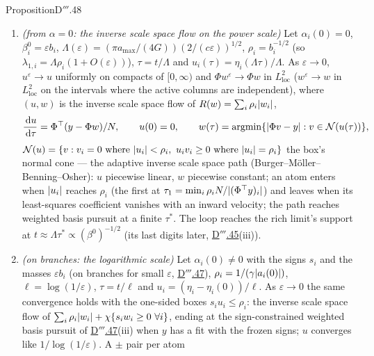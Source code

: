 \begin{thm}{Proposition}{D$'''$.48}
\begin{enumerate}[label=\textup{(\roman*)}]
    is a continuum --- $\alpha(0)\propto\varepsilon^p$ with $0 < p < \frac12$ and $\beta^0\propto\varepsilon$ give
    $\varepsilon^{-p}\log(1/\varepsilon)$, and a branch start with $\alpha(0)\lesssim\varepsilon^{1/2}$ is still on the
    power scale.
  \item \emph{(from $\alpha = 0$: the inverse scale space flow on the power scale)} Let $\alpha_i(0) = 0$,
    $\beta^0_i = \varepsilon b_i$, $\Lambda(\varepsilon) = (\pi a_{\max}/(4G))(2/(c\varepsilon))^{1/2}$,
    $\rho_i = b_i^{-1/2}$ (so $\lambda_{1,i} = \Lambda\rho_i(1 + O(\varepsilon))$), $\tau = t/\Lambda$ and
    $u_i(\tau) = \eta_i(\Lambda\tau)/\Lambda$. As $\varepsilon\to0$, $u^\varepsilon\to u$ uniformly on compacts of
    $[0,\infty)$ and $\Phi w^\varepsilon\to\Phi w$ in $L^2_{\mathrm{loc}}$ ($w^\varepsilon\to w$ in
    $L^2_{\mathrm{loc}}$ on the intervals where the active columns are independent), where $(u,w)$ is the inverse scale
    space flow of $R(w) = \sum_i\rho_i\lvert w_i\rvert$,
    \[
      \frac{\,\mathrm{d} u}{\,\mathrm{d}\tau} = \Phi^\top(y - \Phi w)/N,\qquad u(0) = 0,\qquad
      w(\tau) = \operatorname{argmin}\{\lvert \Phi v - y\rvert : v\in\mathcal N(u(\tau))\},
    \]
    $\mathcal N(u) = \{v : v_i = 0\ \text{where}\ \abs{u_i} < \rho_i,\ u_iv_i\ge0\ \text{where}\ \abs{u_i} = \rho_i\}$
    the box's normal cone --- the adaptive inverse scale space path (Burger--M\"oller--Benning--Osher): $u$ piecewise
    linear, $w$ piecewise constant; an atom enters when $\lvert u_i\rvert$ reaches $\rho_i$ (the first at
    $\tau_1 = \min_i\rho_iN/\lvert (\Phi^\top y)_i\rvert$) and leaves when its least-squares coefficient vanishes with an inward
    velocity; the path reaches weighted basis pursuit at a finite $\tau^*$. The loop reaches the rich limit's support at
    $t\approx\Lambda\tau^*\propto(\beta^0)^{-1/2}$ (its last digits later, \hyperref[res:thmDppp:45]{D$'''$.45}(iii)).
  \item \emph{(on branches: the logarithmic scale)} Let $\alpha_i(0)\ne0$ with the signs $s_i$ and the masses
    $\varepsilon b_i$ (on branches for small $\varepsilon$, \hyperref[res:thmDppp:47]{D$'''$.47}),
    $\rho_i = 1/(\gamma\lvert a_i(0)\rvert)$, $\ell = \log(1/\varepsilon)$, $\tau = t/\ell$ and
    $u_i = (\eta_i - \eta_i(0))/\ell$. As $\varepsilon\to0$ the same convergence holds with the one-sided boxes
    $s_iu_i\le\rho_i$: the inverse scale space flow of $\sum_i\rho_i\lvert w_i\rvert + \chi\{s_iw_i\ge0\ \forall i\}$, ending at
    the sign-constrained weighted basis pursuit of \hyperref[res:thmDppp:47]{D$'''$.47}(iii) when $y$ has a fit with the
    frozen signs; $u$ converges like $1/\log(1/\varepsilon)$. A $\pm$ pair per atom

\end{enumerate}
\end{thm}
